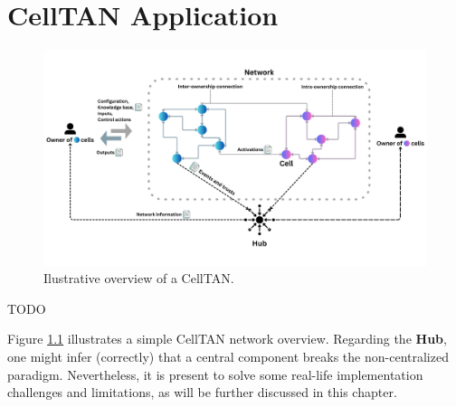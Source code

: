 \chapter{CellTAN Application} \label{chap:chap5}


\begin{figure}[h!]
    \centering
    \includegraphics[width=\linewidth]{figures/chapter4/cell/celltan.pdf}
    \caption{Ilustrative overview of a CellTAN.}
    \label{fig:celltan}
\end{figure}


TODO

Figure \ref{fig:celltan} illustrates a simple CellTAN network overview. Regarding the \textbf{Hub}, one might infer (correctly) that a central component breaks the non-centralized paradigm. Nevertheless, it is present to solve some real-life implementation challenges and limitations, as will be further discussed in this chapter.